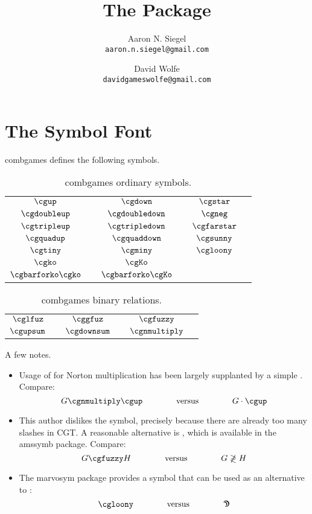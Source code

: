 \documentclass{article}
\title{The \combgames{} Package}
\author{Aaron N. Siegel\\\texttt{aaron.n.siegel@gmail.com} \and
        David Wolfe\\\texttt{davidgameswolfe@gmail.com}}
\newcommand\cn[1]{\texttt{\string#1}}
\newcommand\ds[1]{$#1$ & \cn{#1}}
\newcommand\combgames{\textsf{combgames}}
\begin{document}
\maketitle

\tableofcontents

\section{The Symbol Font}

\combgames{} defines the following symbols.

\begin{table}[H]
\centering
\begin{tabular}{clclcl}
\ds{\cgup} & \ds{\cgdown} & \ds{\cgstar} \bigstrut\\
\ds{\cgdoubleup} & \ds{\cgdoubledown} & \ds{\cgneg} \bigstrut\\
\ds{\cgtripleup} & \ds{\cgtripledown} & \ds{\cgfarstar} \bigstrut\\
\ds{\cgquadup} & \ds{\cgquaddown} & \ds{\cgsunny} \bigstrut\\
\ds{\cgtiny} & \ds{\cgminy} & \ds{\cgloony} \bigstrut\\
\ds{\cgko} & \ds{\cgKo} \bigstrut\\
\ds{\cgkobar} & \ds{\cgKobar} \bigstrut
\end{tabular}
\caption{\combgames{} ordinary symbols.}
\end{table}

\begin{table}[H]
\centering
\begin{tabular}{clclcl}
\ds{\cglfuz} & \ds{\cggfuz} & \ds{\cgfuzzy} \bigstrut\\
\ds{\cgupsum} & \ds{\cgdownsum} & \ds{\cgnmultiply} \bigstrut
\end{tabular}
\caption{\combgames{} binary relations.}
\end{table}

A few notes.

\begin{itemize}
\item Usage of \cn{\cgnmultiply} for Norton multiplication has been largely supplanted by a simple \cn{\cdot}.  Compare:
\[G \cgnmultiply \cgup \qquad\qquad \textrm{versus} \qquad\qquad G \cdot \cgup\]
\item This author dislikes the \cn{\cgfuzzy} symbol, precisely because there are already too many slashes in CGT.  A reasonable alternative is \cn{\not}\cn{\gtrless}, which is available in the \textsf{amssymb} package.  Compare:
\[G \cgfuzzy H \qquad\qquad \textrm{versus} \qquad\qquad G \not\gtrless H\]
\item The \textsf{marvosym} package provides a \cn{\Moon} symbol that can be used as an alternative to \cn{\cgloony}:
\[\cgloony \qquad\qquad \textrm{versus} \qquad\qquad \textrm{\Moon}\]
\end{itemize}
\end{document}
